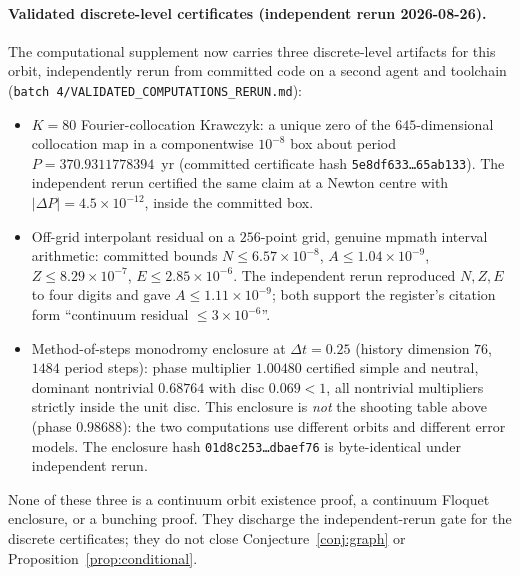 \documentclass[11pt]{article}
\theoremstyle{definition}
\theoremstyle{remark}
\begin{document}
\paragraph{Validated discrete-level certificates (independent rerun 2026-08-26).}
The computational supplement now carries three discrete-level artifacts for this orbit, independently rerun from committed code on a second agent and toolchain (\texttt{batch 4/VALIDATED\_COMPUTATIONS\_RERUN.md}):
\begin{itemize}
\item $K=80$ Fourier-collocation Krawczyk: a unique zero of the $645$-dimensional collocation map in a componentwise $10^{-8}$ box about period $P=370.9311778394$~yr (committed certificate hash \texttt{5e8df633\ldots65ab133}). The independent rerun certified the same claim at a Newton centre with $|\Delta P|=4.5\times 10^{-12}$, inside the committed box.
\item Off-grid interpolant residual on a $256$-point grid, genuine mpmath interval arithmetic: committed bounds $N\le 6.57\times 10^{-8}$, $A\le 1.04\times 10^{-9}$, $Z\le 8.29\times 10^{-7}$, $E\le 2.85\times 10^{-6}$. The independent rerun reproduced $N,Z,E$ to four digits and gave $A\le 1.11\times 10^{-9}$; both support the register's citation form ``continuum residual $\le 3\times 10^{-6}$''.
\item Method-of-steps monodromy enclosure at $\Delta t=0.25$ (history dimension $76$, $1484$ period steps): phase multiplier $1.00480$ certified simple and neutral, dominant nontrivial $0.68764$ with disc $0.069<1$, all nontrivial multipliers strictly inside the unit disc. This enclosure is \emph{not} the shooting table above (phase $0.98688$): the two computations use different orbits and different error models. The enclosure hash \texttt{01d8c253\ldots dbaef76} is byte-identical under independent rerun.
\end{itemize}
None of these three is a continuum orbit existence proof, a continuum Floquet enclosure, or a bunching proof. They discharge the independent-rerun gate for the discrete certificates; they do not close Conjecture~\ref{conj:graph} or Proposition~\ref{prop:conditional}.
\end{document}
